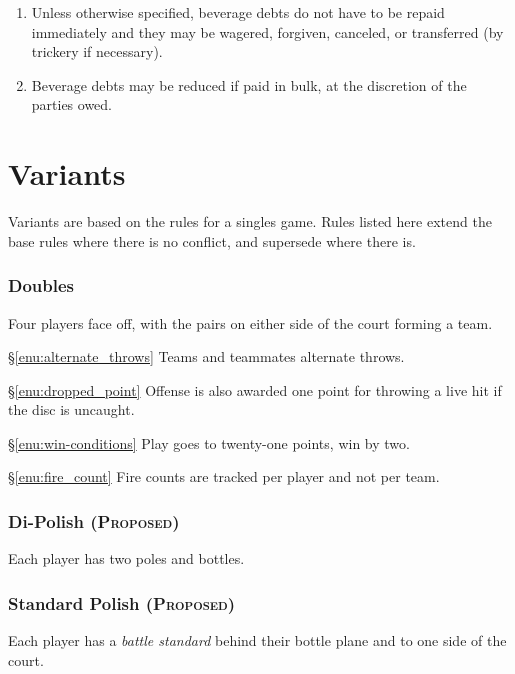 \documentclass[11pt,letterpaper,twocolumn,english,DIV=calc]{scrartcl}
\newcommand{\proposed}{{\color{DarkRed}\textsc{(Proposed)} }}
\begin{document}
\begin{enumerate}[leftmargin=2.8em, label=\thesubsection.\arabic*]
	\item Unless otherwise specified, beverage debts do not have to be repaid immediately and they may be wagered, forgiven, canceled, or transferred (by trickery if necessary). 
	\item Beverage debts may be reduced if paid in bulk, at the discretion of the parties owed.
\end{enumerate}



\part*{Variants}
\label{part:variants}

Variants are based on the rules for a singles game. Rules listed here extend the base rules where there is no conflict, and supersede where there is.

\section{Doubles}
Four players face off, with the pairs on either side of the court forming a team. 

\begin{description}
	\item{\S\ref{enu:alternate_throws}} Teams and teammates alternate throws. 
	\item{\S\ref{enu:dropped_point}} Offense is also awarded one point for throwing a live hit if the disc is uncaught.
	\item{\S\ref{enu:win-conditions}} Play goes to twenty-one points, win by two.
	\item{\S\ref{enu:fire_count}} Fire counts are tracked per player and not per team.
\end{description}

\section{Di-Polish \proposed}
Each player has two poles and bottles.

\section{Standard Polish \proposed}
Each player has a \emph{battle standard} behind their bottle plane and to one side of the court.



\end{document}
